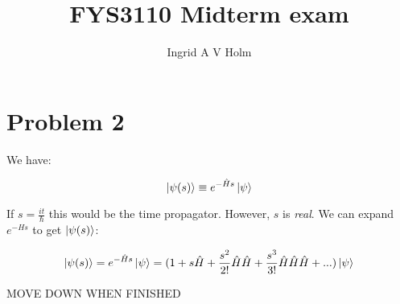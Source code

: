 \documentclass[11pt]{article}
\begin{document}
\title{FYS3110 Midterm exam}
\author{Ingrid A V Holm}
\maketitle


\section{Problem 2}

\begin{flushleft}
We have:

\begin{equation}
\ket{\psi(s)} \equiv e^{-\hat{H}s} \ket{\psi}
\end{equation}

If $s= \frac{it}{\hbar}$ this would be the time propagator. However, $s$ is \textit{real}. We can expand $e^{-Hs}$ to get $\ket{\psi(s)}$:

$$
\ket{\psi(s)} =
e^{-\hat{H}s}
\ket{\psi}
= (1 + s \hat{H} + \frac{s^2}{2!} \hat{H} \hat{H} + \frac{s^3}{3!} \hat{H} \hat{H} \hat{H} + ...) \ket{\psi}
$$
\end{flushleft}

MOVE DOWN WHEN FINISHED
\end{document}
